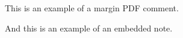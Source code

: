 \documentclass{article}
\begin{document}
This is an example of a margin PDF comment.

And this is an example of an embedded note.
\end{document}

